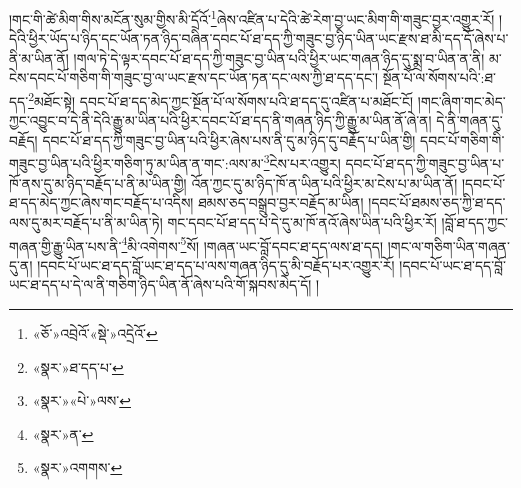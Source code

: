 །གང་གི་ཚེ་མིག་གིས་མངོན་སུམ་གྱིས་མི་དྲོའོ་\footnote{«ཅོ་»འབྲེའོ་«སྡེ་»འདྲེའོ་}ཞེས་འཛིན་པ་དེའི་ཚེ་རེག་བྱ་ཡང་མིག་གི་གཟུང་བྱར་འགྱུར་རོ། །དེའི་ཕྱིར་ཡོད་པ་ཉིད་དང་ཡོན་ཏན་ཉིད་བཞིན་དབང་པོ་ཐ་དད་ཀྱི་གཟུང་བྱ་ཉིད་ཡིན་ཡང་རྫས་ཐ་མི་དད་དོ་ཞེས་པ་ནི་མ་ཡིན་ནོ། །གལ་ཏེ་དེ་ལྟར་དབང་པོ་ཐ་དད་ཀྱི་གཟུང་བྱ་ཡིན་པའི་ཕྱིར་ཡང་གཞན་ཉིད་དུ་སྨྲ་བ་ཡིན་ན་ནི། མ་ངེས་དབང་པོ་གཅིག་གི་གཟུང་བྱ་ལ་ཡང་རྫས་དང་ཡོན་ཏན་དང་ལས་ཀྱི་ཐ་དད་དང་། སྔོན་པོ་ལ་སོགས་པའི་:ཐ་དད་\footnote{«སྣར་»ཐ་དད་པ་}མཐོང་སྟེ། དབང་པོ་ཐ་དད་མེད་ཀྱང་སྔོན་པོ་ལ་སོགས་པའི་ཐ་དད་དུ་འཛིན་པ་མཐོང་ངོ། །གང་ཞིག་གང་མེད་ཀྱང་འབྱུང་བ་དེ་ནི་དེའི་རྒྱུ་མ་ཡིན་པའི་ཕྱིར་དབང་པོ་ཐ་དད་ནི་གཞན་ཉིད་ཀྱི་རྒྱུ་མ་ཡིན་ནོ་ཞེ་ན། དེ་ནི་གཞན་དུ་བརྗོད། དབང་པོ་ཐ་དད་ཀྱི་གཟུང་བྱ་ཡིན་པའི་ཕྱིར་ཞེས་པས་ནི་དུ་མ་ཉིད་དུ་བརྗོད་པ་ཡིན་གྱི། དབང་པོ་གཅིག་གི་གཟུང་བྱ་ཡིན་པའི་ཕྱིར་གཅིག་ཏུ་མ་ཡིན་ན་གང་:ལས་མ་\footnote{«སྣར་»«པེ་»ལས་}ངེས་པར་འགྱུར། དབང་པོ་ཐ་དད་ཀྱི་གཟུང་བྱ་ཡིན་པ་ཁོ་ནས་དུ་མ་ཉིད་བརྗོད་པ་ནི་མ་ཡིན་གྱི། འོན་ཀྱང་དུ་མ་ཉིད་ཁོ་ན་ཡིན་པའི་ཕྱིར་མ་ངེས་པ་མ་ཡིན་ནོ། །དབང་པོ་ཐ་དད་མེད་ཀྱང་ཞེས་གང་བརྗོད་པ་འདིས། ཐམས་ཅད་བསྒྲུབ་བྱར་བརྗོད་མ་ཡིན། །དབང་པོ་ཐམས་ཅད་ཀྱི་ཐ་དད་ལས་དུ་མར་བརྗོད་པ་ནི་མ་ཡིན་ཏེ། གང་དབང་པོ་ཐ་དད་པ་དེ་དུ་མ་ཁོ་ནའོ་ཞེས་ཡིན་པའི་ཕྱིར་རོ། །བློ་ཐ་དད་ཀྱང་གཞན་གྱི་རྒྱུ་ཡིན་པས་ནི་\footnote{«སྣར་»ན་}མི་འགེགས་\footnote{«སྣར་»འགགས་}སོ། །གཞན་ཡང་བློ་དབང་ཐ་དད་ལས་ཐ་དད། །གང་ལ་གཅིག་ཡིན་གཞན་དུ་ན། །དབང་པོ་ཡང་ཐ་དད་བློ་ཡང་ཐ་དད་པ་ལས་གཞན་ཉིད་དུ་མི་བརྗོད་པར་འགྱུར་རོ། །དབང་པོ་ཡང་ཐ་དད་བློ་ཡང་ཐ་དད་པ་དེ་ལ་ནི་གཅིག་ཉིད་ཡིན་ནོ་ཞེས་པའི་གོ་སྐབས་མེད་དོ། །
